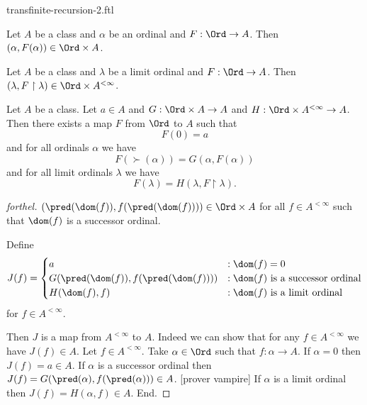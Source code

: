 \documentclass{naproche-library}
\begin{document}
\begin{smodule}[title=Transfinite Recursion II]{transfinite-recursion-2.ftl}
  
\begin{lemma}[forthel,id=transfinite-recursion_029348573987483]
  Let $A$ be a class and $\alpha$ be an ordinal and $F : \Ord \to A$.
  Then $(\alpha, F(\alpha)) \in \Ord \times A$.
\end{lemma}

\begin{lemma}[forthel,id=transfinite-recursion_570293857449281]
  Let $A$ be a class and $\lambda$ be a limit ordinal and $F : \Ord \to A$.
  Then $(\lambda, F \restriction \lambda) \in \Ord \times A^{< \infty}$.
\end{lemma}

\begin{corollary}[forthel,id=transfinite-recursion_298647309184593]
  Let $A$ be a class.
  Let $a \in A$ and $G : \Ord \times A \to A$ and $H : \Ord \times A^{< \infty} \to A$.
  Then there exists a map $F$ from $\Ord$ to $A$ such that
  \[ F(0) = a \]
  and for all ordinals $\alpha$ we have
  \[ F(\succ(\alpha)) = G(\alpha, F(\alpha)) \]
  and for all limit ordinals $\lambda$ we have
  \[ F(\lambda) = H(\lambda, F \restriction \lambda). \]
\end{corollary}
\begin{proof}[forthel]
  $(\pred(\dom(f)), f(\pred(\dom(f)))) \in \Ord \times A$ for all $f \in A^{< \infty}$ such that $\dom(f)$ is a successor ordinal.

  Define  \[ J(f) =
    \begin{cases}
      a
      & : \dom(f) = 0
      \\
      G(\pred(\dom(f)), f(\pred(\dom(f))))
      & : \text{$\dom(f)$ is a successor ordinal}
      \\
      H(\dom(f), f)
      & : \text{$\dom(f)$ is a limit ordinal}
    \end{cases} \]
  for $f \in A^{< \infty}$.

  Then $J$ is a map from $A^{< \infty}$ to $A$.
  Indeed we can show that for any $f \in A^{< \infty}$ we have $J(f) \in A$.
    Let $f \in A^{< \infty}$.
    Take $\alpha \in \Ord$ such that $f : \alpha \to A$.
    If $\alpha = 0$ then $J(f) = a \in A$.
    If $\alpha$ is a successor ordinal then $J(f) =
    G(\pred(\alpha), f(\pred(\alpha))) \in A$.
    [prover vampire]
    If $\alpha$ is a limit ordinal then $J(f) = H(\alpha, f) \in A$.
  End.


\end{proof}
\end{smodule}
\end{document}
